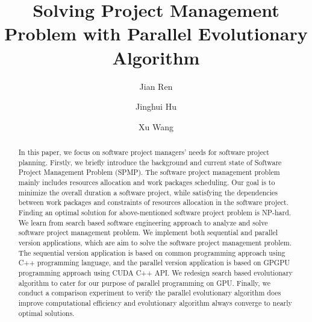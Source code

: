 %
\title{Solving Project Management Problem with Parallel Evolutionary Algorithm}
%
%
\author{Jian Ren \and Jinghui Hu \and Xu Wang}
%
%
%

\maketitle

\begin{abstract}
In this paper, we focus on software project managers’ needs for
software project planning. Firstly, we briefly introduce
the background and current state of Software Project Management Problem (SPMP).
The software project management problem mainly includes resources allocation
and work packages scheduling. Our goal is to minimize the overall duration a software
project, while satisfying the dependencies between work packages and constraints of resources
allocation in the software project. Finding an optimal solution for above-mentioned software
project problem is NP-hard. We learn from search based software engineering approach to
analyze and solve software project management problem. We implement both sequential and
parallel version applications, which are aim to solve the software project management
problem. The sequential version application is based on common programming approach using
C++ programming language, and the parallel version application is based on GPGPU programming
approach using CUDA C++ API. We redesign search based evolutionary algorithm to cater for our
purpose of parallel programming on GPU. Finally, we conduct a comparison experiment to verify
the parallel evolutionary algorithm does improve computational efficiency and evolutionary
algorithm always converge to nearly optimal solutions. 
\end{abstract}
